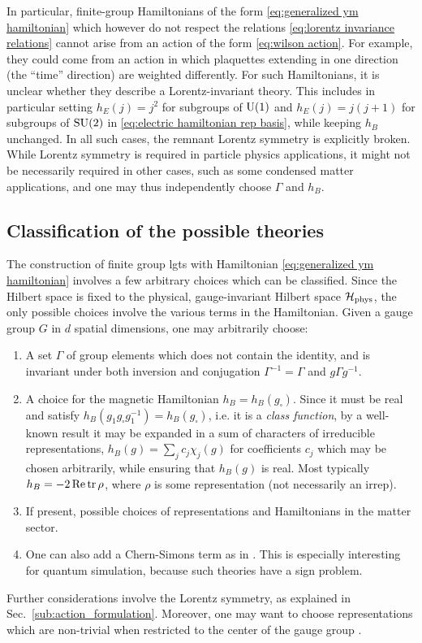 In particular, finite-group Hamiltonians of the form \eqref{eq:generalized ym hamiltonian} which however do not respect the relations \eqref{eq:lorentz invariance relations} cannot arise from an action of the form \eqref{eq:wilson action}.
For example, they could come from an action in which plaquettes extending in one direction (the ``time'' direction) are weighted differently.
For such Hamiltonians, it is unclear whether they describe a Lorentz-invariant theory.
This includes in particular setting $h_E(j)=j^2$ for subgroups of $\mathrm{U}(1)$ and $h_E(j)=j(j+1)$ for subgroups of $\text{SU}(2)$ in \eqref{eq:electric hamiltonian rep basis}, while keeping $h_B$ unchanged.
In all such cases, the remnant Lorentz symmetry is explicitly broken.
While Lorentz symmetry is required in particle physics applications, it might not be necessarily required in other cases, such as some condensed matter applications, and one may thus independently choose $\Gamma$ and $h_B$.



\subsection{Classification of the possible theories}
\label{sub:classification_of_theories}

The construction of finite group \acp{lgt} with Hamiltonian \eqref{eq:generalized ym hamiltonian} involves a few arbitrary choices which can be classified.
Since the Hilbert space is fixed to the physical, gauge-invariant Hilbert space $\mathcal{H}_{\text{phys}}$, the only possible choices involve the various terms in the Hamiltonian.
Given a gauge group $G$ in $d$ spatial dimensions, one may arbitrarily choose:
\begin{enumerate}
    \item A set $\Gamma$ of group elements which does not contain the identity, and is invariant under both inversion and conjugation $\Gamma^{-1}=\Gamma$ and $g \Gamma g^{-1}$.
    \item A choice for the magnetic Hamiltonian $h_B = h_B(g_\square)$.
Since it must be real and satisfy $h_B(g_1 g_\square g_1^{-1})= h_B(g_\square)$, i.e.
it is a \textit{class function}, by a well-known result \cite{serre1967representations} it may be expanded in a sum of characters of irreducible representations, $h_B(g) = \sum_j c_j \chi_j(g)$ for coefficients $c_j$ which may be chosen arbitrarily, while ensuring that $h_B(g)$ is real.
Most typically $h_B = -2 \Re\tr\rho$, where $\rho$ is some representation (not necessarily an \ac{irrep}).
    \item If present, possible choices of representations and Hamiltonians in the matter sector.

    \item One can also add a Chern-Simons term as in \cite{caspar2016doubledlattice}.
This is especially interesting for quantum simulation, because such theories have a sign problem.
\end{enumerate}
Further considerations involve the Lorentz symmetry, as explained in Sec.~\ref{sub:action_formulation}.
Moreover, one may want to choose representations which are non-trivial when restricted to the center of the gauge group \cite{holland2001center, cohen2014center}.

